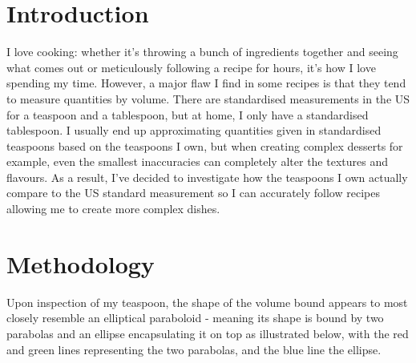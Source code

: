 \documentclass[12pt]{article}
\begin{document}
\section{Introduction}

I love cooking: whether it's throwing a bunch of ingredients together and seeing what comes out or meticulously following a recipe for hours, it's how I love spending my time. However, a major flaw I find in some recipes is that they tend to measure quantities by volume. There are standardised measurements in the US for a teaspoon and a tablespoon, but at home, I only have a standardised tablespoon. I usually end up approximating quantities given in standardised teaspoons based on the teaspoons I own, but when creating complex desserts for example, even the smallest inaccuracies  can completely alter the textures and flavours. As a result, I've decided to investigate how the teaspoons I own actually compare to the US standard measurement so I can accurately follow recipes allowing me to create more complex dishes.

\section{Methodology}\label{method}

Upon inspection of my teaspoon, the shape of the volume bound appears to most closely resemble an elliptical paraboloid - meaning its shape is bound by two parabolas and an ellipse encapsulating it on top as illustrated below, with the red and green lines representing the two parabolas, and the blue line the ellipse. 
\end{document}
